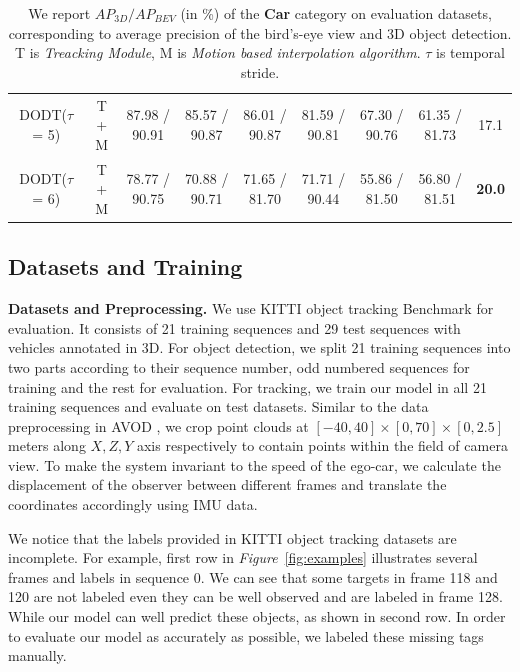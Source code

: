 \documentclass[a4paper, 10pt, conference]{ieeeconf}      %
\def\figurename{\emph{Figure}}
\begin{document}
\begin{table}
{\begin{tabular}{ccccccccc}
			\multicolumn{1}{c|}{DODT($\tau$ = 5)}     &\multicolumn{1}{c|}{T + M} & 87.98 / 90.91  & 85.57 / 90.87 & \multicolumn{1}{c|}{86.01 / 90.87}  & 81.59 / 90.81 & 67.30 / 90.76 & \multicolumn{1}{c|}{61.35 / 81.73}   & 17.1\\
			\multicolumn{1}{c|}{DODT($\tau$ = 6)}     &\multicolumn{1}{c|}{T + M} & 78.77 / 90.75  & 70.88 / 90.71 & \multicolumn{1}{c|}{71.65 / 81.70}  & 71.71 / 90.44 & 55.86 / 81.50 & \multicolumn{1}{c|}{56.80 / 81.51}   & \textbf{20.0} \\ \midrule
	\end{tabular}}
	\setlength{\abovecaptionskip}{1.5pt}
	\caption{We report $AP_{3D}/AP_{BEV}$ (in \%) of the \textbf{Car} category on evaluation datasets, corresponding to average precision of the bird’s-eye view and 3D object detection. T is \textit{Treacking Module}, M is \textit{Motion based interpolation algorithm}. $\tau$ is temporal stride.} 
	\label{table:result_detection}
	\vspace{-0.6cm}
\end{table}

\subsection{Datasets and Training}

\textbf{Datasets and Preprocessing.} We use KITTI object tracking Benchmark \cite{geiger2013vision} for evaluation. It consists of 21 training sequences and 29 test sequences with vehicles annotated in 3D. For object detection, we split 21 training sequences into two parts according to their sequence number, odd numbered sequences for training and the rest for evaluation. For tracking, we train our model in all 21 training sequences and evaluate on test datasets. Similar to the data preprocessing in AVOD \cite{ku2018joint}, we crop point clouds at $[-40, 40] \times [0, 70] \times [0, 2.5]$ meters along $X, Z, Y$ axis respectively to contain points within the field of camera view. To make the system invariant to the speed of the ego-car, we calculate the displacement of the observer between different frames and translate the coordinates accordingly using IMU data. 

We notice that the labels provided in KITTI object tracking datasets are incomplete. For example, first row in \figurename \, \ref{fig:examples} illustrates several frames and labels in sequence 0. We can see that some targets in frame 118 and 120 are not labeled even they can be well observed and are labeled in frame 128. While our model can well predict these objects, as shown in second row. In order to evaluate our model as accurately as possible, we labeled these missing tags manually.
\end{document}
